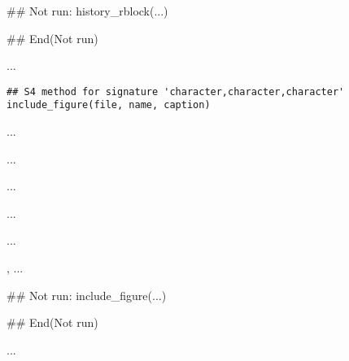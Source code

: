\documentclass[letterpaper]{book}
\begin{document}
%
\begin{Examples}
\begin{ExampleCode}
## Not run: 
history_rblock(...)

## End(Not run)
\end{ExampleCode}
\end{Examples}
%
\begin{Description}\relax
...
\end{Description}
%
\begin{Usage}
\begin{verbatim}
## S4 method for signature 'character,character,character'
include_figure(file, name, caption)
\end{verbatim}
\end{Usage}
%
\begin{Arguments}
\begin{ldescription}
\item[\code{file}] ...

\item[\code{name}] ...

\item[\code{caption}] ...
\end{ldescription}
\end{Arguments}
%
\begin{Details}\relax
...
\end{Details}
%
\begin{Value}
...
\end{Value}
%
\begin{SeeAlso}\relax
{}, ...
\end{SeeAlso}
%
\begin{Examples}
\begin{ExampleCode}
## Not run: 
include_figure(...)

## End(Not run)
\end{ExampleCode}
\end{Examples}
%
\begin{Description}\relax
...
\end{Description}
\end{document}
